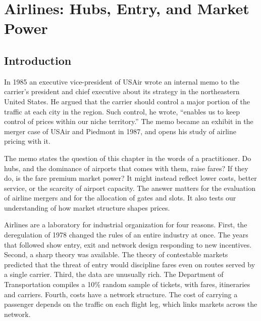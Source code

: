 \chapter{Airlines: Hubs, Entry, and Market Power}\label{ch:airlines}

\section{Introduction}\label{sec:09-intro}

In 1985 an executive vice-president of USAir wrote an internal memo to the carrier's president and chief
executive about its strategy in the northeastern United States. He argued that the carrier should control a
major portion of the traffic at each city in the region. Such control, he wrote, ``enables us to keep
control of prices within our niche territory.'' The memo became an exhibit in the merger case of USAir and
Piedmont in 1987, and \citet[p.~344]{Borenstein1989} opens his study of airline pricing with it.

The memo states the question of this chapter in the words of a practitioner. Do hubs, and the dominance of
airports that comes with them, raise fares? If they do, is the fare premium market power? It might instead
reflect lower costs, better service, or the scarcity of airport capacity. The answer matters for the
evaluation of airline mergers and for the allocation of gates and slots. It also tests our understanding of
how market structure shapes prices.

Airlines are a laboratory for industrial organization for four reasons. First, the deregulation of 1978
changed the rules of an entire industry at once. The years that followed show entry, exit and network design
responding to new incentives. Second, a sharp theory was available. The theory of contestable markets
predicted that the threat of entry would discipline fares even on routes served by a single carrier. Third,
the data are unusually rich. The Department of Transportation compiles a 10\% random sample of tickets, with
fares, itineraries and carriers. Fourth, costs have a network structure. The cost of carrying a passenger
depends on the traffic on each flight leg, which links markets across the network.

